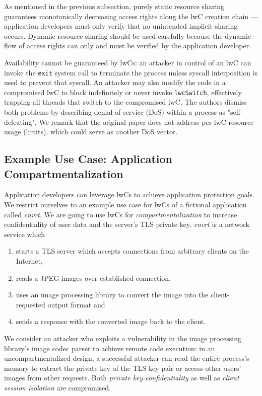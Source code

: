 \documentclass[10pt,twocolumn,a4paper]{article}
\begin{document}
As mentioned in the previous subsection, purely static resource sharing guarantees monotonically decreasing access rights along the lwC creation chain ---
application developers must only verify that no unintended implicit sharing occurs.
Dynamic resource sharing should be used carefully because the dynamic flow of access rights can only and must be verified by the application developer.
\cite{lwcpaper}

Availability cannot be guaranteed by lwCs:
an attacker in control of an lwC can invoke the \lstinline{exit} system call to terminate the process unless syscall interposition is used to prevent that syscall.
An attacker may also modify the code in a compromised lwC to block indefinitely or never invoke \lstinline{lwcSwitch}, effectively trapping all threads that switch to the compromised lwC.
The authors dismiss both problems by describing denial-of-service (DoS) within a process as "self-defeating".
We remark that the original paper does not address per-lwC resource usage (limits), which could serve as another DoS vector. 
\cite{lwcpaper}


\subsection{Example Use Case: Application Compartmentalization}\label{design:usage}

Application developers can leverage lwCs to achieve application protection goals.
We restrict ourselves to an example use case for lwCs of a fictional application called \newcommand\appname{\textit{cnvrt}\xspace} \appname.
We are going to use lwCs for \textit{compartmentalization} to increase confidentiality of user data and the server's TLS private key. 
\appname is a network service which
\begin{enumerate}[nosep]
  \item starts a TLS server which accepts connections from arbitrary clients on the Internet,
  \item reads a JPEG images over established connection,
  \item uses an image processing library to convert the image into the client-requested output format and
  \item sends a response with the converted image back to the client.
\end{enumerate}

We consider an attacker who exploits a vulnerability in the image processing library's image codec parser to achieve remote code execution:
in an uncompartmentalized design, a successful attacker can read the entire process's memory to extract the private key of the TLS key pair or access other users' images from other requests.
Both \textit{private key confidentiality} as well as \textit{client session isolation} are compromised.
\end{document}
